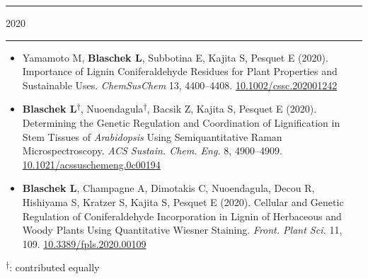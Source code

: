 \documentclass[11pt]{article}
\newcommand*{\xdash}[1][3em]{\rule[0.5ex]{#1}{0.55pt}}
\begin{document}
\hspace*{\fill} \xdash[6em] \large{\textsc{2020}} \xdash[6em] \hspace*{\fill} \normalsize

\vspace{-0.175cm}	
\begin{itemize}[label={},itemindent=-9pt,leftmargin=24pt]
	\itemsep-0.1cm
	\item Yamamoto M, \textbf{Blaschek L}, Subbotina E, Kajita S, Pesquet E (2020). Importance of Lignin Coniferaldehyde Residues for Plant Properties and Sustainable Uses. \textit{ChemSusChem} 13, 4400–4408.
	\href{https://doi.org/10.1002/cssc.202001242}{10.1002/cssc.202001242}
	\item \textbf{Blaschek L}\textsuperscript{$\dagger$}, Nuoendagula\textsuperscript{$\dagger$}, Bacsik Z, Kajita S, Pesquet E (2020). Determining the Genetic Regulation and Coordination of Lignification in Stem Tissues of \textit{Arabidopsis} Using Semiquantitative Raman Microspectroscopy. \textit{ACS Sustain. Chem. Eng.} 8, 4900--4909. \href{https://dx.doi.org/10.1021/acssuschemeng.0c00194}{10.1021/acssuschemeng.0c00194}
	\item \textbf{Blaschek L}, Champagne A, Dimotakis C, Nuoendagula, Decou R, Hishiyama S, Kratzer S, Kajita S, Pesquet E (2020). Cellular and Genetic Regulation of Coniferaldehyde Incorporation in Lignin of Herbaceous and Woody Plants Using Quantitative Wiesner Staining. \textit{Front. Plant Sci.} 11, 109. \href{https://doi.org/10.3389/fpls.2020.00109}{10.3389/fpls.2020.00109}
\end{itemize}

%

\textsuperscript{$\dagger$}: contributed equally
\vspace{0.5cm}
\end{document}
